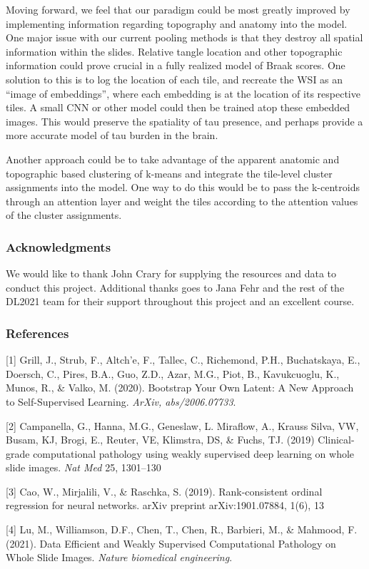 \documentclass{article} %
\begin{document}
Moving forward, we feel that our paradigm could be most greatly improved by implementing information regarding topography and anatomy into the model. One major issue with our current pooling methods is that they destroy all spatial information within the slides. Relative tangle location and other topographic information could prove crucial in a fully realized model of Braak scores. One solution to this is to log the location of each tile, and recreate the WSI as an “image of embeddings”, where each embedding is at the location of its respective tiles. A small CNN or other model could then be trained atop these embedded images. This would preserve the spatiality of tau presence, and perhaps provide a more accurate model of tau burden in the brain. 

Another approach could be to take advantage of the apparent anatomic and topographic based clustering of k-means and integrate the tile-level cluster assignments into the model. One way to do this would be to pass the k-centroids through an attention layer and weight the tiles according to the attention values of the cluster assignments. 


\subsubsection*{Acknowledgments}

We would like to thank John Crary for supplying the resources and data to conduct this project. Additional thanks goes to Jana Fehr and the rest of the DL2021 team for their support throughout this project and an excellent course.

\subsubsection*{References}

\small{
[1] Grill, J., Strub, F., Altch'e, F., Tallec, C., Richemond, P.H., Buchatskaya, E., Doersch, C., Pires, B.A., Guo, Z.D., Azar, M.G., Piot, B., Kavukcuoglu, K., Munos, R., \& Valko, M. (2020). Bootstrap Your Own Latent: A New Approach to Self-Supervised Learning. {\it ArXiv, abs/2006.07733}.

[2] Campanella, G., Hanna, M.G., Geneslaw, L. Miraflow, A., Krauss Silva, VW, Busam, KJ, Brogi, E., Reuter, VE, Klimstra, DS, \& Fuchs, TJ. (2019) Clinical-grade computational pathology using weakly supervised deep learning on whole slide images. {\it Nat Med} 25, 1301–130

[3] Cao, W., Mirjalili, V., \& Raschka, S. (2019). Rank-consistent ordinal regression for neural networks. arXiv preprint arXiv:1901.07884, 1(6), 13

[4] Lu, M., Williamson, D.F., Chen, T., Chen, R., Barbieri, M., \& Mahmood, F. (2021). Data Efficient and Weakly Supervised Computational Pathology on Whole Slide Images. {\it Nature biomedical engineering}.
}
\end{document}
